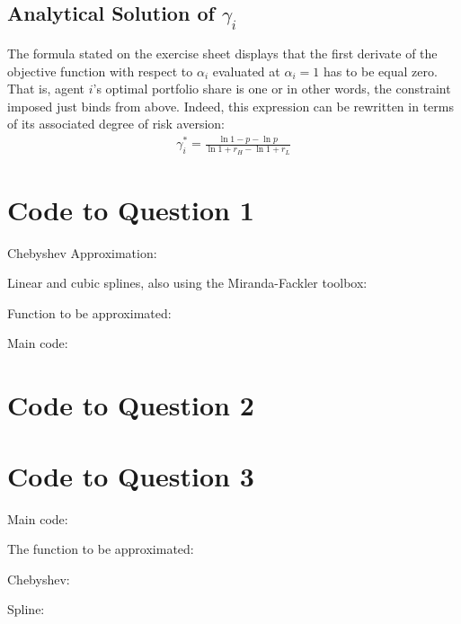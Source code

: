 \documentclass{article}
\begin{document}
\subsection{Analytical Solution of $\gamma_i$}
The formula stated on the exercise sheet  displays that the first derivate of the objective function with respect to $\alpha_i$ evaluated at $\alpha_i=1$ has to be equal zero. That is, agent $i$'s optimal portfolio share is one or in other words, the constraint imposed just binds from above. Indeed, this expression can be rewritten in terms of its associated degree of risk aversion: \begin{align*}
\gamma_i^*=\frac{\ln{1-p}-\ln{p}}{\ln {1+r_H}-\ln {1+r_L}}
\end{align*}
\newpage
\begin{appendices}
\section{Code to Question 1}
Chebyshev Approximation:

Linear and cubic splines, also using the Miranda-Fackler toolbox:

Function to be approximated:

Main code:

\section{Code to Question 2}

\section{Code to Question 3}
Main code:

The function to be approximated:

Chebyshev:

Spline:

\end{appendices}
\end{document}
